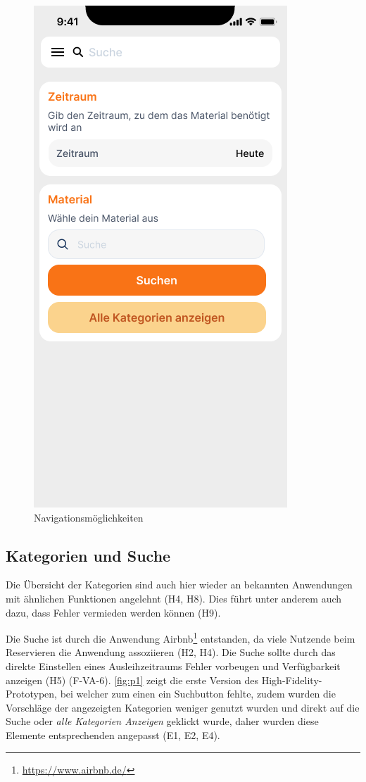 \begin{figure}[h]
    \includegraphics[scale=0.4]{Bilder/Prototyp/Neu/Suche V2.png}
    \caption[-]{Navigationsmöglichkeiten}
    \label{fig:nav}
\end{figure}

\subsection{Kategorien und Suche}
Die Übersicht der Kategorien sind auch hier wieder an bekannten Anwendungen mit ähnlichen Funktionen
angelehnt (H4, H8). Dies führt unter anderem auch dazu, dass Fehler vermieden werden können (H9).

Die Suche ist durch die Anwendung Airbnb\footnote{\url{https://www.airbnb.de/}} entstanden, da viele
Nutzende beim Reservieren die Anwendung assoziieren (H2, H4). Die Suche sollte durch das direkte
Einstellen eines Ausleihzeitraums Fehler vorbeugen und Verfügbarkeit anzeigen (H5) (F-VA-6).
\ref{fig:p1} zeigt die erste Version des High-Fidelity-Prototypen, bei welcher zum einen ein
Suchbutton fehlte, zudem wurden die Vorschläge der angezeigten Kategorien weniger genutzt wurden und
direkt auf die Suche oder \textit{alle Kategorien Anzeigen} geklickt wurde, daher wurden diese
Elemente entsprechenden angepasst (E1, E2, E4).

